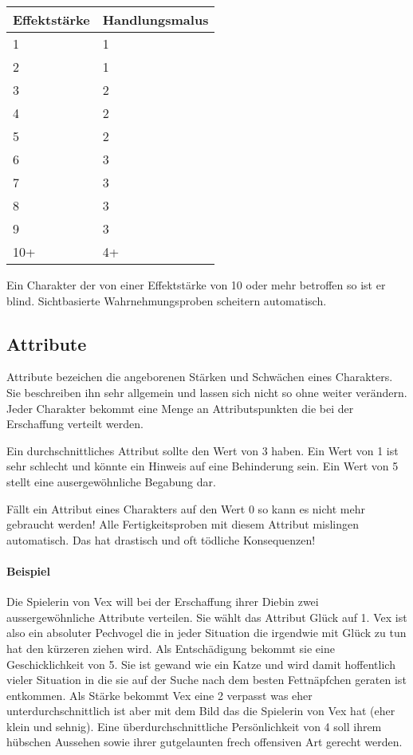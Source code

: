 \documentclass{article}
\begin{document}
\begin{small}
\begin{tabular}{|m{2cm}|m{3cm}|}
\hline
\textbf{Effektstärke}&\textbf{Handlungsmalus}\\
\hline
\hline
1&1\\
\hline
2&1\\
\hline
3&2\\
\hline
4&2\\
\hline
5&2\\
\hline
6&3\\
\hline
7&3\\
\hline
8&3\\
\hline
9&3\\
\hline
10+&4+\\
\hline
\end{tabular}
\end{small}

Ein Charakter der von einer Effektstärke von 10 oder mehr betroffen so ist er blind. Sichtbasierte Wahrnehmungsproben
scheitern automatisch.

\begin{center}
\section{Attribute}
\end{center}

Attribute bezeichen die angeborenen Stärken und Schwächen eines Charakters. Sie beschreiben ihn sehr allgemein und
lassen sich nicht so ohne weiter verändern. Jeder Charakter bekommt eine Menge an Attributspunkten die bei der
Erschaffung verteilt werden.

Ein durchschnittliches Attribut sollte den Wert von 3 haben. Ein Wert von 1 ist sehr schlecht und könnte ein Hinweis
auf eine Behinderung sein. Ein Wert von 5 stellt eine ausergewöhnliche Begabung dar.

Fällt ein Attribut eines Charakters auf den Wert 0 so kann es nicht mehr gebraucht werden! Alle Fertigkeitsproben
mit diesem Attribut mislingen automatisch. Das hat drastisch und oft tödliche Konsequenzen!

\paragraph{Beispiel}

Die Spielerin von Vex will bei der Erschaffung ihrer Diebin zwei aussergewöhnliche Attribute verteilen. Sie wählt das
Attribut Glück auf 1. Vex ist also ein absoluter Pechvogel die in jeder Situation die irgendwie mit Glück zu tun hat
den kürzeren ziehen wird. Als Entschädigung bekommt sie eine Geschicklichkeit von 5. Sie ist gewand wie ein Katze und
wird damit hoffentlich vieler Situation in die sie auf der Suche nach dem besten Fettnäpfchen geraten ist entkommen.
Als Stärke bekommt Vex eine 2 verpasst was eher unterdurchschnittlich ist aber mit dem Bild das die Spielerin von Vex
hat (eher klein und sehnig). Eine überdurchschnittliche Persönlichkeit von 4 soll ihrem hübschen Aussehen sowie ihrer
gutgelaunten frech offensiven Art gerecht werden.
\end{document}
